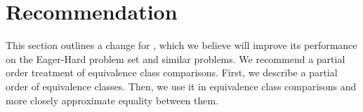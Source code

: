 \section{\us{} Recommendation}

    This section outlines a change for \us{}, which we believe will improve its performance on the Eager-Hard problem set and similar problems. We recommend a partial order treatment of equivalence class comparisons. First, we describe a partial order of equivalence classes. Then, we use it in equivalence class comparisons and more closely approximate equality between them.

